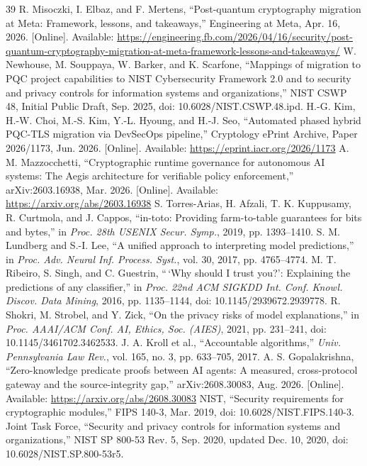 \begin{thebibliography}{39}
R. Misoczki, I. Elbaz, and F. Mertens, ``Post-quantum cryptography migration at Meta: Framework, lessons, and takeaways,'' Engineering at Meta, Apr. 16, 2026. [Online]. Available: \url{https://engineering.fb.com/2026/04/16/security/post-quantum-cryptography-migration-at-meta-framework-lessons-and-takeaways/}
W. Newhouse, M. Souppaya, W. Barker, and K. Scarfone, ``Mappings of migration to PQC project capabilities to NIST Cybersecurity Framework 2.0 and to security and privacy controls for information systems and organizations,'' NIST CSWP 48, Initial Public Draft, Sep. 2025, doi: 10.6028/NIST.CSWP.48.ipd.
H.-G. Kim, H.-W. Choi, M.-S. Kim, Y.-L. Hyoung, and H.-J. Seo, ``Automated phased hybrid PQC-TLS migration via DevSecOps pipeline,'' Cryptology ePrint Archive, Paper 2026/1173, Jun. 2026. [Online]. Available: \url{https://eprint.iacr.org/2026/1173}
A. M. Mazzocchetti, ``Cryptographic runtime governance for autonomous AI systems: The Aegis architecture for verifiable policy enforcement,'' arXiv:2603.16938, Mar. 2026. [Online]. Available: \url{https://arxiv.org/abs/2603.16938}
S. Torres-Arias, H. Afzali, T. K. Kuppusamy, R. Curtmola, and J. Cappos, ``in-toto: Providing farm-to-table guarantees for bits and bytes,'' in \emph{Proc. 28th USENIX Secur. Symp.}, 2019, pp. 1393--1410.
S. M. Lundberg and S.-I. Lee, ``A unified approach to interpreting model predictions,'' in \emph{Proc. Adv. Neural Inf. Process. Syst.}, vol. 30, 2017, pp. 4765--4774.
M. T. Ribeiro, S. Singh, and C. Guestrin, ``\,`Why should I trust you?': Explaining the predictions of any classifier,'' in \emph{Proc. 22nd ACM SIGKDD Int. Conf. Knowl. Discov. Data Mining}, 2016, pp. 1135--1144, doi: 10.1145/2939672.2939778.
R. Shokri, M. Strobel, and Y. Zick, ``On the privacy risks of model explanations,'' in \emph{Proc. AAAI/ACM Conf. AI, Ethics, Soc. (AIES)}, 2021, pp. 231--241, doi: 10.1145/3461702.3462533.
J. A. Kroll et al., ``Accountable algorithms,'' \emph{Univ. Pennsylvania Law Rev.}, vol. 165, no. 3, pp. 633--705, 2017.
A. S. Gopalakrishna, ``Zero-knowledge predicate proofs between AI agents: A measured, cross-protocol gateway and the source-integrity gap,'' arXiv:2608.30083, Aug. 2026. [Online]. Available: \url{https://arxiv.org/abs/2608.30083}
NIST, ``Security requirements for cryptographic modules,'' FIPS 140-3, Mar. 2019, doi: 10.6028/NIST.FIPS.140-3.
Joint Task Force, ``Security and privacy controls for information systems and organizations,'' NIST SP 800-53 Rev. 5, Sep. 2020, updated Dec. 10, 2020, doi: 10.6028/NIST.SP.800-53r5.

\end{thebibliography}
